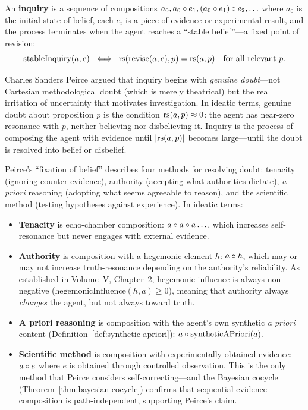 \begin{definition}
\label{def:inquiry}
An \textbf{inquiry} is a sequence of compositions
$a_0, a_0 \circ e_1, (a_0 \circ e_1) \circ e_2, \ldots$ where
$a_0$ is the initial state of belief, each $e_i$ is a piece of evidence or
experimental result, and the process terminates when the agent reaches a
``stable belief''---a fixed point of revision:
\[
  \mathrm{stableInquiry}(a, e) \;\iff\; \mathrm{rs}(\mathrm{revise}(a, e), p)
  = \mathrm{rs}(a, p) \quad\text{for all relevant } p.
\]
\end{definition}

\begin{interpretation}
Charles Sanders Peirce argued that inquiry begins with \emph{genuine doubt}---not
Cartesian methodological doubt (which is merely theatrical) but the real
irritation of uncertainty that motivates investigation. In ideatic terms, genuine
doubt about proposition $p$ is the condition $\mathrm{rs}(a, p) \approx 0$: the agent
has near-zero resonance with $p$, neither believing nor disbelieving it. Inquiry
is the process of composing the agent with evidence until $|\mathrm{rs}(a, p)|$ becomes
large---until the doubt is resolved into belief or disbelief.

Peirce's ``fixation of belief'' describes four methods for resolving doubt:
tenacity (ignoring counter-evidence), authority (accepting what authorities
dictate), \emph{a priori} reasoning (adopting what seems agreeable to reason),
and the scientific method (testing hypotheses against experience). In ideatic
terms:
\begin{itemize}
\item \textbf{Tenacity} is echo-chamber composition: $a \circ a \circ a \ldots$,
  which increases self-resonance but never engages with external evidence.
\item \textbf{Authority} is composition with a hegemonic element $h$: $a \circ h$,
  which may or may not increase truth-resonance depending on the authority's
  reliability. As established in Volume~V, Chapter~2, hegemonic influence is
  always non-negative ($\mathrm{hegemonicInfluence}(h, a) \geq 0$), meaning
  that authority always \emph{changes} the agent, but not always toward truth.
\item \textbf{A priori reasoning} is composition with the agent's own
  synthetic \emph{a priori} content (Definition~\ref{def:synthetic-apriori}):
  $a \circ \mathrm{syntheticAPriori}(a)$.
\item \textbf{Scientific method} is composition with experimentally obtained
  evidence: $a \circ e$ where $e$ is obtained through controlled observation.
  This is the only method that Peirce considers self-correcting---and the
  Bayesian cocycle (Theorem~\ref{thm:bayesian-cocycle}) confirms that sequential
  evidence composition is path-independent, supporting Peirce's claim.
\end{itemize}
\end{interpretation}

